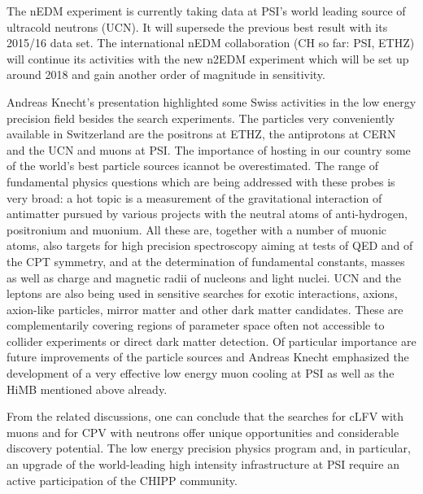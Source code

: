 \noindent  The nEDM experiment is currently taking data at PSI's world leading
source of ultracold neutrons (UCN). It will supersede the previous
best result with its 2015/16 data set. The international nEDM
collaboration (CH so far: PSI, ETHZ) will continue its activities with
the new n2EDM experiment which will be set up around 2018 and gain
another order of magnitude in sensitivity.

\medskip
\noindent Andreas Knecht's presentation highlighted some Swiss activities in the
low energy precision field besides the search experiments. The
particles very conveniently available in Switzerland are the positrons
at ETHZ, the antiprotons at CERN and the UCN and muons at PSI. 
The importance of hosting in our country some of the world's best particle
sources icannot be overestimated. The range of fundamental physics questions
which are being addressed with these probes is very broad: a hot topic
is a measurement of the gravitational interaction of antimatter
pursued by various projects with the neutral atoms of anti-hydrogen,
positronium and muonium. All these are, together with a number of
muonic atoms, also targets for high precision spectroscopy aiming at
tests of QED and of the CPT symmetry, and at the determination of fundamental
constants, masses as well as charge and magnetic radii of nucleons and light
nuclei. UCN and the leptons are also being used in sensitive searches
for exotic interactions, axions, axion-like particles, mirror matter
and other dark matter candidates. These are complementarily covering
regions of parameter space often not accessible to collider
experiments or direct dark matter detection. Of particular importance
are future improvements of the particle sources and Andreas Knecht
emphasized the development of a very effective low energy muon cooling
at PSI as well as the HiMB mentioned above already.
\medskip 

\noindent From the related discussions, one can conclude that the searches for
cLFV with muons and for CPV with neutrons offer unique opportunities
and considerable discovery potential. The low energy precision physics
program and, in particular, an upgrade of the world-leading high
intensity infrastructure at PSI require an active participation of the
CHIPP community.
